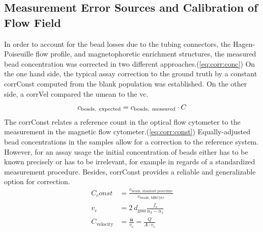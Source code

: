 \clearpage
\subsection{Measurement Error Sources and Calibration of Flow Field}
\label{sec:res:Correction}
In order to account for the bead losses due to the tubing connectors, the Hagen-Poiseuille flow profile, and magnetophoretic enrichment structures, the measured bead concentration was corrected in two different approaches.(\cref{eq:corr:conc}) On the one hand side, the typical assay correction to the ground truth by a constant \gls{corrConst} computed from the blank population was established. On the other side, a \gls{corrVel} compared the \acrfull{umean} to the \gls{vc}.
\begin{equation}	
	c_\text{beads,\, expected} = c_\text{beads,\, measured}  \cdot C \label{eq:corr:conc}
\end{equation}
The \gls{corrConst} relates a reference count in the optical flow cytometer to the measurement in the magnetic flow cytometer.(\cref{eq:corr:const}) Equally-adjusted bead concentrations in the samples allow for a correction to the reference system. However, for an assay usage the initial concentration of beads either has to be known precisely or has to be irrelevant, for example in regards of a standardized measurement procedure. Besides, \gls{corrConst} provides a reliable and generalizable option for correction. 
\begin{align}
	C_const &= \frac{c_\text{beads, standard procedure}}{c_\text{beads, MRCyte}} \label{eq:corr:const}\\
	v_\text{c} &= 2\ d_\text{gmr} \frac{f_\text{s}}{n_\text{3}-n_\text{1}} \label{eq:v:c} \\
	C_\text{velocity} &= \frac{\overline{\mathbf{u}}}{v_\text{c}} = \frac{Q}{A \cdot v_\text{c}} \label{eq:corr:vel} 
\end{align}
